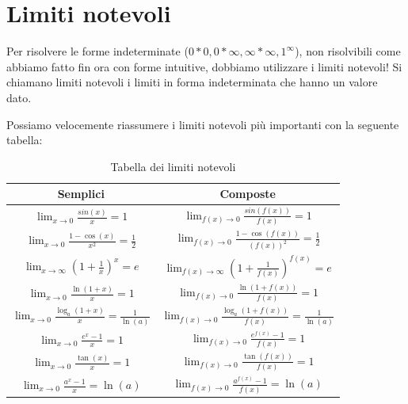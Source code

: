 \section{Limiti notevoli}
Per risolvere le forme indeterminate ($0*0,0*\infty,\infty*\infty,1^\infty$), non risolvibili come abbiamo fatto fin ora con forme intuitive, dobbiamo utilizzare i limiti notevoli!
Si chiamano limiti notevoli i limiti in forma indeterminata che hanno un valore dato.

Possiamo velocemente riassumere i limiti notevoli più importanti con la seguente tabella:
\begin{table}[ht]
    \centering
    \begin{tabular}{|c|c|}
         \hline\textbf{Semplici} & \textbf{Composte} \\\hline\hline
         $\lim_{x\to 0} \frac{sin(x)}{x}=1$ & $\lim_{f(x)\to 0} \frac{sin(f(x))}{f(x)}=1$\\\hline
         $\lim_{x\to 0}\frac{1-\cos(x)}{x^2}=\frac{1}{2}$ & $\lim_{f(x)\to 0}\frac{1-\cos (f(x))}{(f(x))^2}=\frac{1}{2}$\\\hline
         $\lim_{x\to\infty}(1+\frac{1}{x})^{x}=e$ & $\lim_{f(x)\to\infty}(1+\frac{1}{f(x)})^{f(x)}=e$\\\hline
         $\lim_{x\to 0} \frac{\ln(1+x)}{x}=1$ & $\lim_{f(x)\to 0} \frac{\ln(1+f(x))}{f(x)}=1$\\\hline
         $\lim_{x\to 0} \frac{\log_{a}(1+x)}{x}=\frac{1}{\ln(a)}$ & $\lim_{f(x)\to 0} \frac{\log_{a}(1+f(x))}{f(x)}=\frac{1}{\ln(a)}$\\\hline
         $\lim_{x\to 0}\frac{e^{x}-1}{x}=1$ & $\lim_{f(x)\to 0}\frac{e^{f(x)}-1}{f(x)}=1$\\\hline
         $\lim_{x\to 0}\frac{\tan(x)}{x}=1$ & $\lim_{f(x)\to 0}\frac{\tan(f(x))}{f(x)}=1$\\\hline
         $\lim_{x\to 0}\frac{a^x-1}{x}=\ln(a)$ & $\lim_{f(x)\to 0}\frac{a^{f(x)}-1}{f(x)}=\ln(a)$\\\hline
         
    \end{tabular}
    \caption{Tabella dei limiti notevoli}
    \label{tab:limiti_notevoli}
\end{table}

